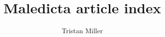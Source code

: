 \documentclass[a4paper]{article}
\begin{document}
\title{Maledicta article index}
\author{Tristan Miller}
\maketitle
\nocite{*}


\end{document}
